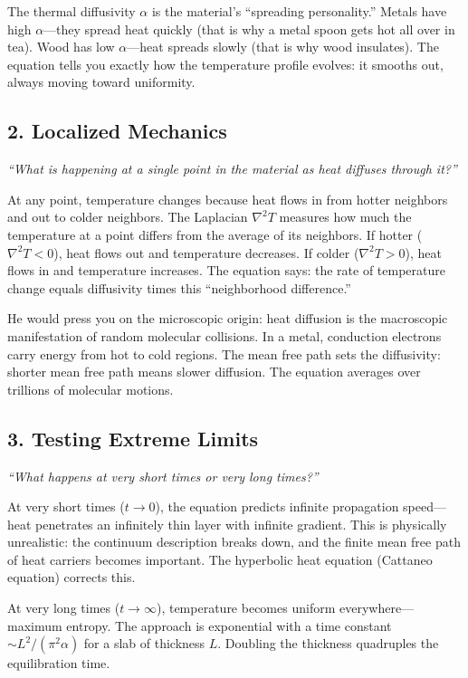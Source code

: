 The thermal diffusivity $\alpha$ is the material's ``spreading personality.'' Metals have high $\alpha$---they spread heat quickly (that is why a metal spoon gets hot all over in tea). Wood has low $\alpha$---heat spreads slowly (that is why wood insulates). The equation tells you exactly how the temperature profile evolves: it smooths out, always moving toward uniformity.

\subsection*{2. Localized Mechanics}
\textit{``What is happening at a single point in the material as heat diffuses through it?''}

At any point, temperature changes because heat flows in from hotter neighbors and out to colder neighbors. The Laplacian $\nabla^2 T$ measures how much the temperature at a point differs from the average of its neighbors. If hotter ($\nabla^2 T < 0$), heat flows out and temperature decreases. If colder ($\nabla^2 T > 0$), heat flows in and temperature increases. The equation says: the rate of temperature change equals diffusivity times this ``neighborhood difference.''

He would press you on the microscopic origin: heat diffusion is the macroscopic manifestation of random molecular collisions. In a metal, conduction electrons carry energy from hot to cold regions. The mean free path sets the diffusivity: shorter mean free path means slower diffusion. The equation averages over trillions of molecular motions.

\subsection*{3. Testing Extreme Limits}
\textit{``What happens at very short times or very long times?''}

At very short times ($t \to 0$), the equation predicts infinite propagation speed---heat penetrates an infinitely thin layer with infinite gradient. This is physically unrealistic: the continuum description breaks down, and the finite mean free path of heat carriers becomes important. The hyperbolic heat equation (Cattaneo equation) corrects this.

At very long times ($t \to \infty$), temperature becomes uniform everywhere---maximum entropy. The approach is exponential with a time constant $\sim L^2/(\pi^2 \alpha)$ for a slab of thickness $L$. Doubling the thickness quadruples the equilibration time.

